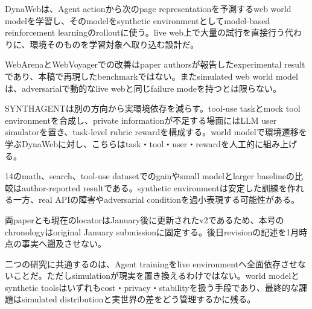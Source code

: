 
DynaWebは、Agent actionから次のpage representationを予測するweb world modelを学習し、そのmodelをsynthetic environmentとしてmodel-based reinforcement learningのrolloutに使う。live web上で大量の試行を直接行う代わりに、環境そのものを学習対象へ取り込む設計だ。\autocite{src-85bc3e4f7b39}


\begin{claimboundary}
WebArenaとWebVoyagerでの改善はpaper authorsが報告したexperimental resultであり、本稿で再現したbenchmarkではない。またsimulated web world modelは、adversarialで動的なlive webと同じfailure modeを持つとは限らない。\autocite{src-85bc3e4f7b39}
\end{claimboundary}

SYNTHAGENTは別の方向から実環境依存を減らす。tool-use taskとmock tool environmentを合成し、private informationが不足する場面にはLLM user simulatorを置き、task-level rubric rewardを構成する。world modelで環境遷移を学ぶDynaWebに対し、こちらはtask・tool・user・rewardを人工的に組み上げる。\autocite{src-01d8ab4a2c6f}


\begin{claimboundary}
14のmath、search、tool-use datasetでのgainやsmall modelとlarger baselineの比較はauthor-reported resultである。synthetic environmentは安定した訓練を作れる一方、real APIの障害やadversarial conditionを過小表現する可能性がある。\autocite{src-01d8ab4a2c6f}
\end{claimboundary}

\begin{claimboundary}
両paperとも現在のlocatorはJanuary後に更新されたv2であるため、本号のchronologyはoriginal January submissionに固定する。後日revisionの記述を1月時点の事実へ遡及させない。\autocite{src-01d8ab4a2c6f,src-85bc3e4f7b39}
\end{claimboundary}

二つの研究に共通するのは、Agent trainingをlive environmentへ全面依存させないことだ。ただしsimulationが現実を置き換えるわけではない。world modelとsynthetic toolsはいずれもcost・privacy・stabilityを扱う手段であり、最終的な課題はsimulated distributionと実世界の差をどう管理するかに残る。\autocite{src-01d8ab4a2c6f,src-85bc3e4f7b39}

